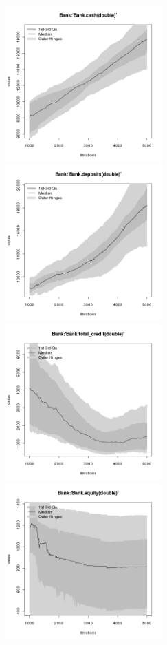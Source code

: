 \begin{figure}[H!]
\centering\leavevmode
\begin{minipage}{14cm}
\centering\leavevmode
\includegraphics[width=6cm]{./png/tax_0.10/Bank-cash.png}
\includegraphics[width=6cm]{./png/tax_0.10/Bank-deposits.png}\\
\includegraphics[width=6cm]{./png/tax_0.10/Bank-total_credit.png}
\includegraphics[width=6cm]{./png/tax_0.10/Bank-equity.png}\\

\end{minipage}
\end{figure}
